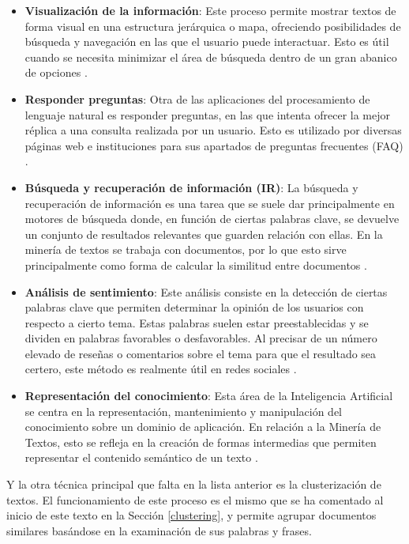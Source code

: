 \documentclass[10pt, a4paper]{article}
\begin{document}
\begin{itemize}
  \item \textbf{Visualización de la información}: Este proceso permite mostrar textos de forma visual en una estructura jerárquica o mapa, ofreciendo posibilidades de búsqueda y navegación en las que el usuario puede interactuar. Esto es útil cuando se necesita minimizar el área de búsqueda dentro de un gran abanico de opciones \cite{a survey of text mining techniques and applications}. 
  
  \item \textbf{Responder preguntas}: Otra de las aplicaciones del procesamiento de lenguaje natural es responder preguntas, en las que intenta ofrecer la mejor réplica a una consulta realizada por un usuario. Esto es utilizado por diversas páginas web e instituciones para sus apartados de preguntas frecuentes (FAQ) \cite{a survey of text mining techniques and applications}.
  
  \item \textbf{Búsqueda y recuperación de información (IR)}: La búsqueda y recuperación de información es una tarea que se suele dar principalmente en motores de búsqueda donde, en función de ciertas palabras clave, se devuelve un conjunto de resultados relevantes que guarden relación con ellas. En la minería de textos se trabaja con documentos, por lo que esto sirve principalmente como forma de calcular la similitud entre documentos \cite{libro jorge}. 
  
  \item \textbf{Análisis de sentimiento}: Este análisis consiste en la detección de ciertas palabras clave que permiten determinar la opinión de los usuarios con respecto a cierto tema. Estas palabras suelen estar preestablecidas y se dividen en palabras favorables o desfavorables. Al precisar de un número elevado de reseñas o comentarios sobre el tema para que el resultado sea certero, este método es realmente útil en redes sociales \cite{libro jorge}.
  
  \item \textbf{Representación del conocimiento}: Esta área de la Inteligencia Artificial se centra en la representación, mantenimiento y manipulación del conocimiento sobre un dominio de aplicación. En relación a la Minería de Textos, esto se refleja en la creación de formas intermedias que permiten representar el contenido semántico de un texto \cite{TFG Jorge}.
  
\end{itemize}

Y la otra técnica principal que falta en la lista anterior es la clusterización de textos. El funcionamiento de este proceso es el mismo que se ha comentado al inicio de este texto en la Sección \ref{clustering}, y permite agrupar documentos similares basándose en la examinación de sus palabras y frases. 
\end{document}
